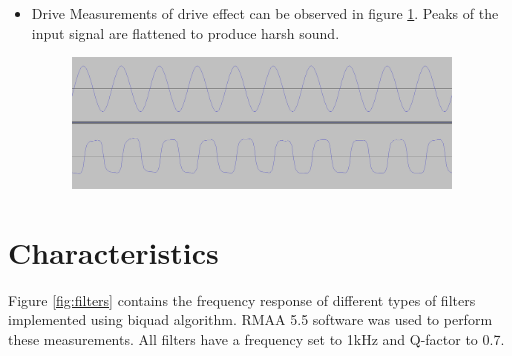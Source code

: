 \documentclass[a4paper,twoside,12pt]{book}
\begin{document}
\begin{itemize}
    \item Drive
    Measurements of drive effect can be observed in figure \ref{fig:drive}.
    Peaks of the input signal are flattened to produce harsh sound.
    
    \begin{figure}[H]
        \centering
        \includegraphics[width=0.95\textwidth]{images/drive}
        \caption{}
        \label{fig:drive}
    \end{figure}
\end{itemize}

\section{Characteristics}
Figure \ref{fig:filters} contains the frequency response of different types of filters 
implemented using biquad algorithm.
RMAA 5.5 software was used to perform these measurements.
All filters have a frequency set to 1kHz and Q-factor to 0.7.
\end{document}
